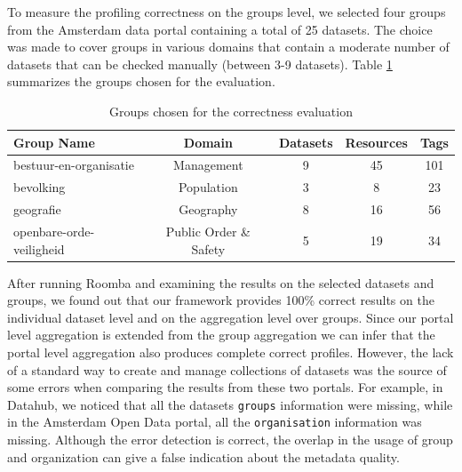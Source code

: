 \documentclass[runningheads,a4paper]{llncs}
\begin{document}
To measure the profiling correctness on the groups level, we selected four groups from the Amsterdam data portal containing a total of 25 datasets. The choice was made to cover groups in various domains that contain a moderate number of datasets that can be checked manually (between 3-9 datasets). Table \ref{tab:groups} summarizes the groups chosen for the evaluation.

\begin{table}[ht]
\centering
\begin{tabular}{|l|c|c|c|c|}
\hline
\textbf{Group Name}      & \textbf{Domain}        & \multicolumn{1}{l|}{\textbf{Datasets}} & \multicolumn{1}{l|}{\textbf{Resources}} & \multicolumn{1}{l|}{\textbf{Tags}} \\ \hline
bestuur-en-organisatie   & Management             & 9                                      & 45                                      & 101                                \\ \hline
bevolking                & Population             & 3                                      & 8                                       & 23                                 \\ \hline
geografie                & Geography              & 8                                      & 16                                      & 56                                 \\ \hline
openbare-orde-veiligheid & Public Order \& Safety & 5                                      & 19                                      & 34                                 \\ \hline
\end{tabular}
\caption{Groups chosen for the correctness evaluation}
\label{tab:groups}
\end{table}

After running Roomba and examining the results on the selected datasets and groups, we found out that our framework provides 100\% correct results on the individual dataset level and on the aggregation level over groups. Since our portal level aggregation is extended from the group aggregation we can infer that the portal level aggregation also produces complete correct profiles. However, the lack of a standard way to create and manage collections of datasets was the source of some errors when comparing the results from these two portals. For example, in Datahub, we noticed that all the datasets \texttt{groups} information were missing, while in the Amsterdam Open Data portal, all the \texttt{organisation} information was missing. Although the error detection is correct, the overlap in the usage of group and organization can give a false indication about the metadata quality.
\end{document}

